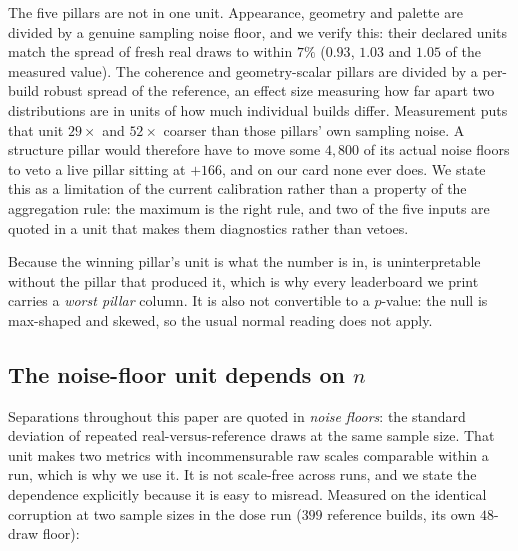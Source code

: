 The five pillars are not in one unit. Appearance, geometry and palette are
divided by a genuine sampling noise floor, and we verify this: their declared
units match the spread of fresh real draws to within $7\%$ ($0.93$, $1.03$ and
$1.05$ of the measured value). The coherence and geometry-scalar pillars are
divided by a per-build robust spread of the reference, an effect size measuring how
far apart two distributions are in units of how much individual builds differ.
Measurement puts that unit $29\times$ and $52\times$ coarser than those
pillars' own sampling noise. A structure pillar would therefore have to move
some $4{,}800$ of its actual noise floors to veto a live pillar sitting at
$+166$, and on our card none ever does. We state this as a limitation of the
current calibration rather than a property of the aggregation rule: the maximum
is the right rule, and two of the five inputs are quoted in a unit that makes
them diagnostics rather than vetoes.

Because the winning pillar's unit is what the number is in, \blockscore{} is
uninterpretable without the pillar that produced it, which is why every
leaderboard we print carries a \emph{worst pillar} column. It is also not
convertible to a $p$-value: the null is max-shaped and skewed, so the usual
normal reading does not apply.

\subsection{The noise-floor unit depends on $n$}
\label{app:nscale}

Separations throughout this paper are quoted in \emph{noise floors}: the
standard deviation of repeated real-versus-reference draws at the same sample
size. That unit makes two metrics with incommensurable raw scales comparable
within a run, which is why we use it. It is not scale-free across runs,
and we state the dependence explicitly because it is easy to misread.
Measured on the identical corruption at two sample sizes in the dose run ($399$ reference
builds, its own $48$-draw floor):

\begin{center}
\small
{}
\end{center}

